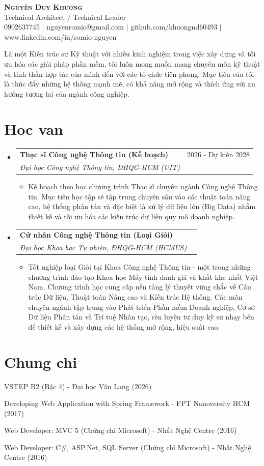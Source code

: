 \documentclass[letterpaper,11pt]{article}
\makeatletter
\newcommand{\resumeItem}[1]{
  \item\small{
    {#1 \vspace{-2pt}}
  }
}
\newcommand{\resumeSubheading}[4]{
  \vspace{-2pt}\item
    \begin{tabular*}{0.97\textwidth}[t]{l@{\extracolsep{\fill}}r}
      \textbf{#1} & #2 \\
      \textit{\small#3} & \textit{\small #4} \\
    \end{tabular*}\vspace{-7pt}
}
\newcommand{\resumeSubHeadingListStart}{\begin{itemize}[leftmargin=0.15in, label={}]}
\newcommand{\resumeSubHeadingListEnd}{\end{itemize}}
\newcommand{\resumeItemListStart}{\begin{itemize}}
\newcommand{\resumeItemListEnd}{\end{itemize}\vspace{-5pt}}
\makeatother
\begin{document}
\begin{center}
    \textbf{\Huge \scshape Nguyễn Duy Khương} \\ \vspace{1pt}
    \small Technical Architect / Technical Leader \\ \vspace{2pt}
    \small 0902637745 $|$ nguyenromio@gmail.com $|$ github.com/khuongnd60493 $|$ www.linkedin.com/in/romio-nguyen
\end{center}

\vspace{4pt}
\small Là một Kiến trúc sư Kỹ thuật với nhiều kinh nghiệm trong việc xây dựng và tối ưu hóa các giải pháp phần mềm, tôi luôn mong muốn mang chuyên môn kỹ thuật và tinh thần hợp tác của mình đến với các tổ chức tiên phong. Mục tiêu của tôi là thúc đẩy những hệ thống mạnh mẽ, có khả năng mở rộng và thích ứng với xu hướng tương lai của ngành công nghiệp.

\section{Hoc van}
  \resumeSubHeadingListStart
    \resumeSubheading
      {Thạc sĩ Công nghệ Thông tin (Kế hoạch)}{2026 - Dự kiến 2028}
      {Đại học Công nghệ Thông tin, ĐHQG-HCM (UIT)}{}
      \resumeItemListStart
        \resumeItem{Kế hoạch theo học chương trình Thạc sĩ chuyên ngành Công nghệ Thông tin. Mục tiêu học tập sẽ tập trung chuyên sâu vào các thuật toán nâng cao, hệ thống phân tán và đặc biệt là xử lý dữ liệu lớn (Big Data) nhằm thiết kế và tối ưu hóa các kiến trúc dữ liệu quy mô doanh nghiệp.}
      \resumeItemListEnd

    \resumeSubheading
      {Cử nhân Công nghệ Thông tin (Loại Giỏi)}{}
      {Đại học Khoa học Tự nhiên, ĐHQG-HCM (HCMUS)}{}
      \resumeItemListStart
        \resumeItem{Tốt nghiệp loại Giỏi tại Khoa Công nghệ Thông tin - một trong những chương trình đào tạo Khoa học Máy tính danh giá và khắt khe nhất Việt Nam. Chương trình học cung cấp nền tảng lý thuyết vững chắc về Cấu trúc Dữ liệu, Thuật toán Nâng cao và Kiến trúc Hệ thống. Các môn chuyên ngành tập trung vào Phát triển Phần mềm Doanh nghiệp, Cơ sở Dữ liệu Phân tán và Trí tuệ Nhân tạo, rèn luyện tư duy kỹ sư nhạy bén để thiết kế và xây dựng các hệ thống mở rộng, hiệu suất cao.}
      \resumeItemListEnd
  \resumeSubHeadingListEnd

\section{Chung chi}
\begin{itemize}[leftmargin=0.15in, label={}]
  \small{\item{
        \resumeItem{VSTEP B2 (Bậc 4) - Đại học Văn Lang (2026)}
        \resumeItem{Developing Web Application with Spring Framework - FPT Nanoversity HCM (2017)}
        \resumeItem{Web Developer: MVC 5 (Chứng chỉ Microsoft) - Nhất Nghệ Centre (2016)}
        \resumeItem{Web Developer: C\#, ASP.Net, SQL Server (Chứng chỉ Microsoft) - Nhất Nghệ Centre (2016)}
  }}
\end{itemize}
\end{document}
